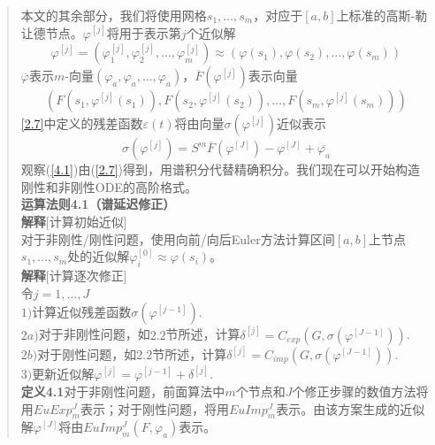 \documentclass{article}
\begin{document}
\begin{CJK}{UTF8}{gkai}
\begin{quotation}
本文的其余部分，我们将使用网格$s_1,\ldots,s_m$，对应于$[a, b]$上标准的高斯-勒让德节点。$\varphi^{[j]}$将用于表示第$j$个近似解\\
$$ \varphi^{[j]}=(\varphi_1^{[j]},\varphi_2^{[j]},\ldots,\varphi_m^{[j]})\approx (\varphi(s_1),\varphi(s_2),\ldots,\varphi(s_m))$$
$\overline{ \varphi}$表示$m$-向量$(\varphi_a,\varphi_a,\ldots,\varphi_a)$，$\overline{F}(\varphi^{[j]})$表示向量\\
$$(F(s_1,\varphi^{[j]}(s_1)),F(s_2,\varphi^{[j]}(s_2)),\ldots,F(s_m,\varphi^{[j]}(s_m)))$$
\ref{2.7}中定义的残差函数$\varepsilon(t)$将由向量$\sigma(\varphi^{[j]})$近似表示\\
\begin{equation}
\sigma(\varphi^{[j]})=S^m \overline{F}( \varphi^{[J]})- \varphi^{[J]}+\overline{\varphi_a}
\label{4.1}
\end{equation}
观察(\ref{4.1})由(\ref{2.7})得到，用谱积分代替精确积分。我们现在可以开始构造刚性和非刚性ODE的高阶格式。\\

\textbf{运算法则4.1（谱延迟修正）}\\

\textbf{解释}[计算初始近似]\\

对于非刚性/刚性问题，使用向前/向后Euler方法计算区间$[a,b]$上节点$s_1,\ldots,s_m$处的近似解$\varphi^{[0]}_{i} \approx \varphi(s_i)$。\\

\textbf{解释}[计算逐次修正]\\

令$j = 1,\ldots,J$\\

$1)$计算近似残差函数$\sigma(\varphi^{[j-1]})$.\\

$2a)$对于非刚性问题，如$2.2$节所述，计算$\delta^{[j]}=C_{exp}(G,\sigma(\varphi^{[J-1]}))$.\\

$2b)$对于刚性问题，如$2.2$节所述，计算$\delta^{[j]}=C_{imp}(G,\sigma(\varphi^{[J-1]}))$.\\

$3)$更新近似解$\varphi^{[j]}=\varphi^{[j-1]}+\delta^{[j]}$.\\

\textbf{定义4.1}对于非刚性问题，前面算法中$m$个节点和$J$个修正步骤的数值方法将用$EuExp_{m}^{J}$表示；对于刚性问题，将用$EuImp_{m}^{J}$表示。由该方案生成的近似解$\varphi^{[J]}$将由$EuImp_{m}^{J}(F,\varphi_a)$表示。\\


\end{quotation}
\end{CJK}
\end{document}

